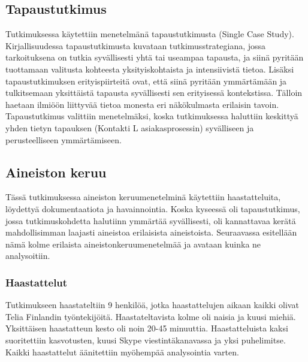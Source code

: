 \documentclass[finnish,12pt,a4paper,pdftex]{article}
\begin{document}
\subsection{Tapaustutkimus}
Tutkimuksessa käytettiin menetelmänä tapaustutkimusta (Single Case Study). Kirjallisuudessa tapaustutkimusta kuvataan tutkimusstrategiana, jossa tarkoituksena on tutkia syvällisesti yhtä tai useampaa tapausta, ja siinä pyritään tuottamaan valitusta kohteesta yksityiskohtaista ja intensiivistä tietoa.
Lisäksi tapaustutkimuksen erityispiirteitä ovat, että siinä pyritään ymmärtämään ja tulkitsemaan yksittäistä tapausta syvällisesti sen erityisessä kontekstissa. Tälloin haetaan ilmiöön liittyvää tietoa monesta eri näkökulmasta erilaisin tavoin. \citep{jyvask} Tapaustutkimus valittiin menetelmäksi, koska tutkimuksessa haluttiin keskittyä yhden tietyn tapauksen (Kontakti L asiakasprosessin) syvälliseen ja perusteelliseen ymmärtämiseen. 

\subsection{Aineiston keruu}
Tässä tutkimuksessa aineiston keruumenetelminä käytettiin haastatteluita, löydettyä dokumentaatiota ja havainnointia. Koska kyseessä oli tapaustutkimus, jossa tutkimuskohdetta halutiinn ymmärtää syvällisesti, oli kannattavaa kerätä mahdollisimman laajasti aineistoa erilaisista aineistoista. Seuraavassa esitellään nämä kolme erilaista aineistonkeruumenetelmää ja avataan kuinka ne analysoitiin.

\subsubsection{Haastattelut}
Tutkimukseen haastateltiin 9 henkilöä, jotka haastattelujen aikaan kaikki olivat Telia Finlandin työntekijöitä. Haastateltavista kolme oli naisia ja kuusi miehiä. Yksittäisen haastatteun kesto oli noin 20-45 minuuttia. Haastatteluista kaksi suoritettiin kasvotusten, kuusi Skype viestintäkanavassa ja yksi puhelimitse. Kaikki haastattelut äänitettiin myöhempää analysointia varten. \\
\end{document}
